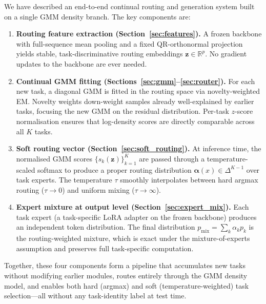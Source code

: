 \documentclass[12pt,a4paper]{article}
\begin{document}
We have described an end-to-end continual routing and generation system built on a single GMM density branch.
The key components are:
\begin{enumerate}
    \item \textbf{Routing feature extraction (Section~\ref{sec:features}).}
          A frozen backbone with full-sequence mean pooling and a fixed QR-orthonormal projection yields stable, task-discriminative routing embeddings $\mathbf{z} \in \mathbb{R}^p$.
          No gradient updates to the backbone are ever needed.

    \item \textbf{Continual GMM fitting (Sections~\ref{sec:gmm}--\ref{sec:router}).}
          For each new task, a diagonal GMM is fitted in the routing space via novelty-weighted EM.
          Novelty weights down-weight samples already well-explained by earlier tasks, focusing the new GMM on the residual distribution.
          Per-task $z$-score normalisation ensures that log-density scores are directly comparable across all $K$ tasks.

    \item \textbf{Soft routing vector (Section~\ref{sec:soft_routing}).}
          At inference time, the normalised GMM scores $\{s_k(\mathbf{z})\}_{k=1}^K$ are passed through a temperature-scaled softmax to produce a proper routing distribution $\bm{\alpha}(x)\in\Delta^{K-1}$ over task experts.
          The temperature $\tau$ smoothly interpolates between hard argmax routing ($\tau\to 0$) and uniform mixing ($\tau\to\infty$).

    \item \textbf{Expert mixture at output level (Section~\ref{sec:expert_mix}).}
          Each task expert (a task-specific LoRA adapter on the frozen backbone) produces an independent token distribution.
          The final distribution $p_{\mathrm{mix}} = \sum_k \alpha_k p_k$ is the routing-weighted mixture, which is exact under the mixture-of-experts assumption and preserves full task-specific computation.
\end{enumerate}
Together, these four components form a pipeline that accumulates new tasks without modifying earlier modules, routes entirely through the GMM density model, and enables both hard (argmax) and soft (temperature-weighted) task selection---all without any task-identity label at test time.
\end{document}
